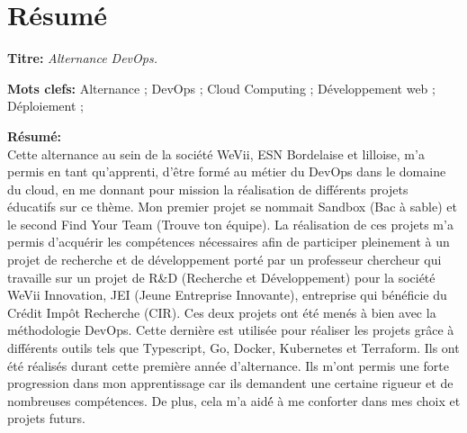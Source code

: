 \chapter*{\centering Résumé}

\begin{mdframed}[style=summary]
    \noindent\textbf{Titre:} \textit{Alternance DevOps.}

    \vspace{0.2cm}
    \noindent\textbf{Mots clefs:} Alternance ; DevOps ; Cloud Computing ; Développement web ; Déploiement ;

    \vspace{0.3cm}
    \begin{multicols}{2}
        \noindent\textbf{Résumé:} \\
        Cette alternance au sein de la société WeVii, ESN Bordelaise et lilloise, m’a permis en tant qu’apprenti, d’être formé au métier du DevOps dans le domaine du cloud, en me donnant pour mission la réalisation de différents projets éducatifs sur ce thème.
        Mon premier projet se nommait Sandbox (Bac à sable) et le second Find Your Team (Trouve ton équipe).
        La réalisation de ces projets m’a permis d’acquérir les compétences nécessaires afin de participer pleinement à un projet de recherche et de développement porté par un professeur chercheur qui travaille sur un projet de R\&D (Recherche et Développement) pour la société WeVii Innovation, JEI (Jeune Entreprise Innovante), entreprise qui bénéficie du Crédit Impôt Recherche (CIR). Ces deux projets ont été menés à bien avec la méthodologie DevOps.
        Cette dernière est utilisée pour réaliser les projets grâce à différents outils tels que Typescript, Go, Docker, Kubernetes et Terraform.
        Ils ont été réalisés durant cette première année d’alternance.
        Ils m’ont permis une forte progression dans mon apprentissage car ils demandent une certaine rigueur et de nombreuses compétences.
        De plus, cela m’a aidé́ à me conforter dans mes choix et projets futurs.
    \end{multicols}
\end{mdframed}

